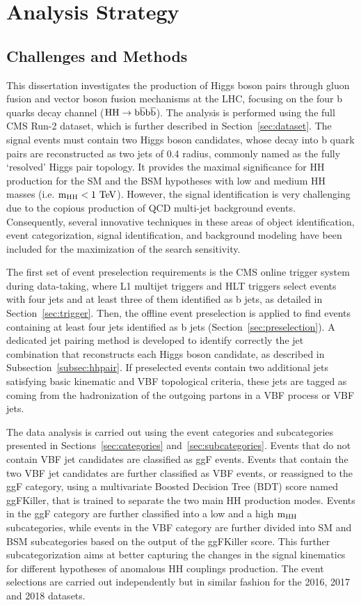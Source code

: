 \chapter{Analysis Strategy} \label{strategy}

\section{Challenges and Methods}
This dissertation investigates the production of Higgs boson pairs through gluon fusion and vector boson fusion mechanisms at the LHC, focusing on the four b quarks decay channel ($\mathrm{HH\rightarrow b\overline{b}b\overline{b} }$). The analysis is performed using the full CMS Run-2 dataset, which is further described in Section~\ref{sec:dataset}. The signal events must contain two Higgs boson candidates, whose decay into b quark pairs are reconstructed as two jets of 0.4 radius, commonly named as the fully `resolved' Higgs pair topology. It provides the maximal significance for HH production for the SM and the BSM hypotheses with low and medium HH masses (i.e. $\mathrm{\mathrm{m_{HH}}<1~TeV}$). However, the signal identification is very challenging due to the copious production of QCD multi-jet background events. Consequently, several innovative techniques in these areas of object identification, event categorization, signal identification, and background modeling have been included for the maximization of the search sensitivity.

The first set of event preselection requirements is the CMS online trigger system during data-taking, where L1 multijet triggers and HLT triggers select events with four jets and at least three of them identified as b jets, as detailed in Section~\ref{sec:trigger}. Then, the offline event preselection is applied to find events containing at least four jets identified as b jets (Section~\ref{sec:preselection}). A dedicated jet pairing method is developed to identify correctly the jet combination that reconstructs each Higgs boson candidate, as described in Subsection~\ref{subsec:hhpair}. If preselected events contain two additional jets satisfying basic kinematic and VBF topological criteria, these jets are tagged as coming from the hadronization of the outgoing partons in a VBF process or VBF jets. 

The data analysis is carried out using the event categories and subcategories presented in Sections~\ref{sec:categories} and~\ref{sec:subcategories}. Events that do not contain VBF jet candidates are classified as ggF events. Events that contain the two VBF jet candidates are further classified as VBF events, or reassigned to the ggF category, using a multivariate Boosted Decision Tree (BDT) score named ggFKiller, that is trained to separate the two main HH production modes. Events in the ggF category are further classified into a low and a high $\mathrm{m_{HH}}$ subcategories, while events in the VBF category are further divided into SM and BSM subcategories based on the output of the ggFKiller score. This further subcategorization aims at better capturing the changes in the signal kinematics for different hypotheses of anomalous HH couplings production. The event selections are carried out independently but in similar fashion for the 2016, 2017 and 2018 datasets. 

